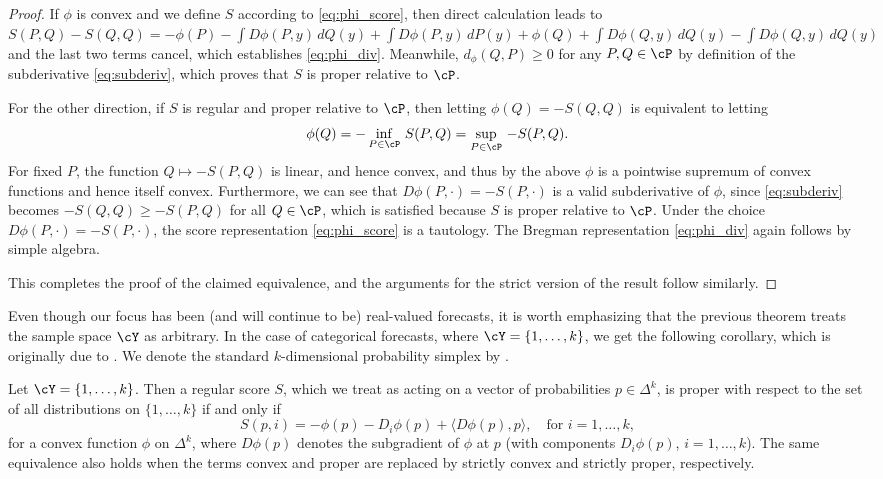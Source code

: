 \documentclass{article}
\begin{document}
\begin{proof}
If $\phi$ is convex and we define $S$ according to \eqref{eq:phi_score}, then
direct calculation leads to $S(P,Q) - S(Q,Q) = -\phi(P) - \int D\phi(P, y) \,
dQ(y) + \int D\phi(P, y) \, dP(y) + \phi(Q) + \int D\phi(Q, y) \, dQ(y) - \int
D\phi(Q, y) \, dQ(y)$ and the last two terms cancel, which establishes 
\eqref{eq:phi_div}. Meanwhile, $d_\phi(Q, P) \geq 0$ for any $P,Q \in \cP$ by
definition of the subderivative \eqref{eq:subderiv}, which proves that $S$ is
proper relative to $\cP$.  

For the other direction, if $S$ is regular and proper relative to $\cP$, then
letting $\phi(Q) = -S(Q, Q)$ is equivalent to letting  
\[
\phi(Q) = -\inf_{P \in \cP} \, S(P, Q) = \sup_{P \in \cP} \, -S(P, Q).
\]
For fixed $P$, the function $Q \mapsto -S(P, Q)$ is linear, and hence convex,
and thus by the above $\phi$ is a pointwise supremum of convex functions and
hence itself convex. Furthermore, we can see that $D\phi(P, \cdot) = -S(P,
\cdot)$ is a valid subderivative of $\phi$, since \eqref{eq:subderiv} becomes 
$-S(Q, Q) \geq -S(P, Q)$ for all $Q \in \cP$, which is satisfied because $S$ is 
proper relative to $\cP$. Under the choice $D\phi(P, \cdot) = -S(P, \cdot)$, the 
score representation \eqref{eq:phi_score} is a tautology. The Bregman
representation \eqref{eq:phi_div} again follows by simple algebra. 

This completes the proof of the claimed equivalence, and the arguments for the
strict version of the result follow similarly.
\end{proof}

Even though our focus has been (and will continue to be) real-valued forecasts,
it is worth emphasizing that the previous theorem treats the sample space $\cY$
as arbitrary. In the case of categorical forecasts, where $\cY = \{1,\dots,k\}$,
we get the following corollary, which is originally due to 
\citet{savage1971elicitation}. We denote the standard $k$-dimensional 
probability simplex by .

\begin{corollary}
Let $\cY = \{1,\dots,k\}$. Then a regular score $S$, which we treat as acting on
a vector of probabilities $p \in \Delta^k$, is proper with respect to the set of
all distributions on $\{1,\dots,k\}$ if and only if 
\[
S(p, i) = -\phi(p) - D_i\phi(p) + \langle D\phi(p), p \rangle , \quad \text{for
  $i=1,\dots,k$},
\]
for a convex function $\phi$ on $\Delta^k$, where $D\phi(p)$ denotes the
subgradient of $\phi$ at $p$ (with components $D_i\phi(p)$, $i=1,\dots,k$). The
same equivalence also holds when the terms convex and proper are replaced by
strictly convex and strictly proper, respectively.     
\end{corollary}
\end{document}
